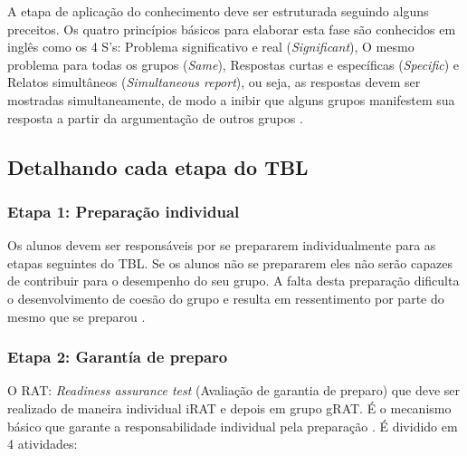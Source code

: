A etapa de aplicação do conhecimento deve ser estruturada seguindo alguns preceitos. Os quatro princípios básicos para elaborar esta fase são conhecidos em inglês como os 4 S’s: Problema significativo e real (\textit{Significant}), O mesmo problema para todas os grupos (\textit{Same}), Respostas curtas e específicas (\textit{Specific}) e Relatos simultâneos (\textit{Simultaneous report}), ou seja, as respostas devem ser mostradas simultaneamente, de modo a inibir que alguns grupos manifestem sua resposta a partir da argumentação de outros grupos \cite{sweet}.

\subsection{Detalhando cada etapa do TBL}

\subsubsection{Etapa 1: Preparação individual}

Os alunos devem ser responsáveis por se prepararem individualmente para as etapas seguintes do TBL. Se os alunos não se prepararem eles não serão capazes de contribuir para o desempenho do seu grupo. A falta desta preparação dificulta o desenvolvimento de coesão do grupo e resulta em ressentimento por parte do mesmo que se preparou \cite{sweet}.

\subsubsection{Etapa 2: Garantía de preparo}

O RAT: \textit{Readiness assurance test} (Avaliação de garantia de preparo) que deve ser realizado de maneira individual iRAT e depois em grupo gRAT. É o mecanismo básico que garante a responsabilidade individual pela preparação \cite{sweet}. É dividido em 4 atividades:

